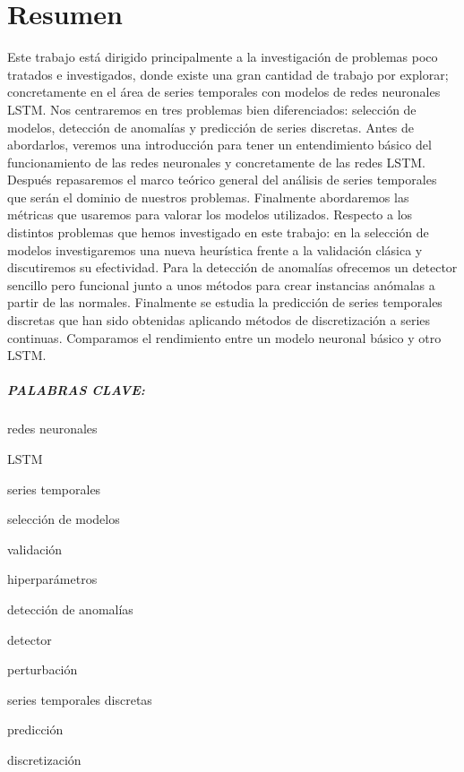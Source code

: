%


\chapter*{Resumen}\label{ch:resumen}

Este trabajo está dirigido principalmente a la investigación de problemas poco tratados e investigados, donde existe una gran cantidad de trabajo por explorar; concretamente en el área de series temporales con modelos de redes neuronales LSTM. Nos centraremos en tres problemas bien diferenciados: selección de modelos, detección de anomalías y predicción de series discretas. Antes de abordarlos, veremos una introducción para tener un entendimiento básico del funcionamiento de las redes neuronales y concretamente de las redes LSTM. Después repasaremos el marco teórico general del análisis de series temporales que serán el dominio de nuestros problemas. Finalmente abordaremos las métricas que usaremos para valorar los modelos utilizados. Respecto a los distintos problemas que hemos investigado en este trabajo: en la selección de modelos investigaremos una nueva heurística frente a la validación clásica y discutiremos su efectividad. Para la detección de anomalías ofrecemos un detector sencillo pero funcional junto a unos métodos para crear instancias anómalas a partir de las normales. Finalmente se estudia la predicción de series temporales discretas que han sido obtenidas aplicando métodos de discretización a series continuas. Comparamos el rendimiento entre un modelo neuronal básico y otro LSTM.

\paragraph{PALABRAS CLAVE:}
\begin{itemize*}[label=,itemsep=1em,itemjoin=\hspace{1em}]
  \item redes neuronales
  \item LSTM
  \item series temporales
  \item selección de modelos
  \item validación
  \item hiperparámetros
  \item detección de anomalías
  \item detector
  \item perturbación
  \item series temporales discretas
  \item predicción
  \item discretización
\end{itemize*}

\endinput

